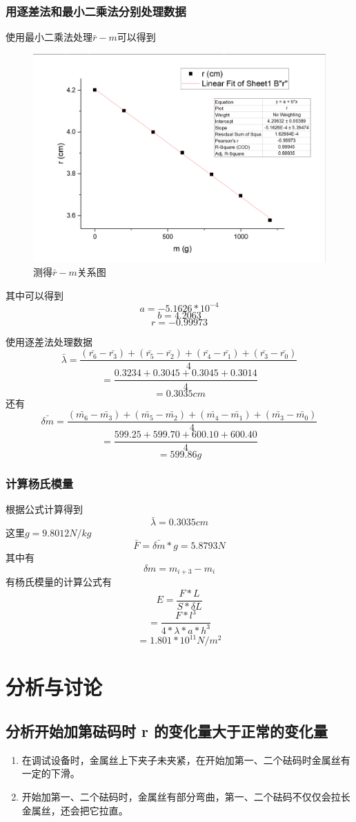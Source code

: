 \documentclass[a4paper,11pt]{article}
\begin{document}
\subsubsection{用逐差法和最小二乘法分别处理数据}
使用最小二乘法处理$ \bar{r} - m $可以得到
\begin{figure}[H]
	\centering
	\includegraphics[width=.8\linewidth]{图片2.png}
	\caption{ 测得$ \bar{r} - m $关系图}
\end{figure}\noindent%
其中可以得到$$ a = -5.1626 * 10^{-4} $$
$$ b = 4.2063 $$
$$ r = -0.99973 $$

使用逐差法处理数据$$  \bar{\lambda} = \dfrac{(\bar{r_6} - \bar{r_3})+(\bar{r_5} - \bar{r_2})+(\bar{r_4} - \bar{r_1})+(\bar{r_3} - \bar{r_0})}{4} $$
$$ = \dfrac{0.3234 + 0.3045 + 0.3045 + 0.3014}{4} $$
$$ = 0.3035 cm $$
还有$$  \bar{\delta m} = \dfrac{(\bar{m_6} - \bar{m_3})+(\bar{m_5} - \bar{m_2})+(\bar{m_4} - \bar{m_1})+(\bar{m_3} - \bar{m_0})}{4} $$
$$ = \dfrac{599.25 + 599.70 + 600.10 + 600.40}{4} $$
$$ = 599.86 g $$
\subsubsection{计算杨氏模量}
根据公式计算得到
$$ \bar{\lambda} = 0.3035 cm $$
这里$g = 9.8012 N/kg$
$$ \bar{F} = \bar{\delta m} * g  = 5.8793 N  $$
其中有$$ \delta m = m_{i+3} - m_{i} $$
有杨氏模量的计算公式有
$$ E = \dfrac{F * L}{S * \delta L } $$
$$  = \dfrac{F * l^3 }{4* \lambda * a * h^3 } $$
$$ = 1.801 * 10 ^{11} N/m^2 $$



	


\section{分析与讨论}
\subsection{分析开始加第砝码时 r 的变化量大于正常的变化量}
     \begin{enumerate}
     	\item 在调试设备时，金属丝上下夹子未夹紧，在开始加第一、二个砝码时金属丝有一定的下滑。
     	\item 开始加第一、二个砝码时，金属丝有部分弯曲，第一、二个砝码不仅仅会拉长金属丝，还会把它拉直。
     	
     \end{enumerate}
    
\end{document}
